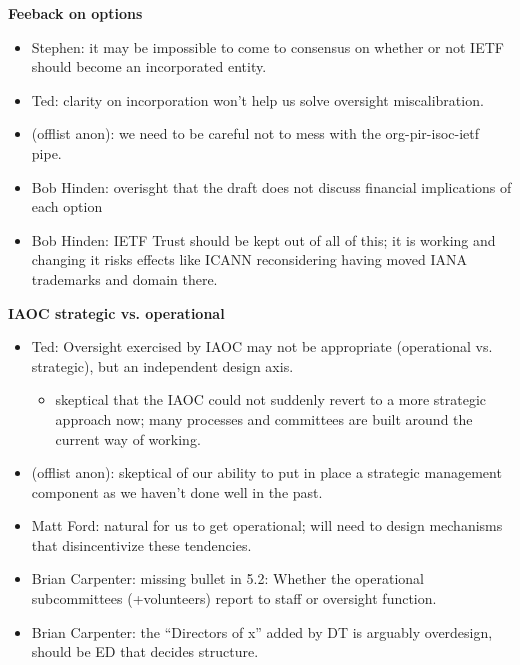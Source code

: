 \documentclass[helvetica]{seminar}
\newcommand{\heading}[1]{%
  \begin{center} 
    \large\bf 
    #1 
  \end{center} 
  \vspace{.4 in}}
\begin{document}
\begin{slide}

\heading{Feeback on options}

\begin{itemize}
\item Stephen: it may be impossible to come to consensus on whether or
  not IETF should become an incorporated entity.
\item Ted: clarity on incorporation won't help us solve oversight
  miscalibration.
\item (offlist anon): we need to be careful not to mess with the
  org-pir-isoc-ietf pipe.
\item Bob Hinden: overisght that the draft does not discuss financial
  implications of each option
\item Bob Hinden: IETF Trust should be kept out of all of this; it is
  working and changing it risks effects like ICANN reconsidering
  having moved IANA trademarks and domain there.
\end{itemize}

\end{slide}


\begin{slide}

\heading{IAOC strategic vs. operational}

\vspace{-8ex}         %
\begin{itemize}
\item Ted: Oversight exercised by IAOC may not be appropriate
  (operational vs. strategic), but an independent design axis.
  \begin{itemize}
  \item skeptical that the IAOC could not suddenly revert to a more
    strategic approach now; many processes and committees are built
    around the current way of working.
  \end{itemize}
\item (offlist anon): skeptical of our ability to put in place a
  strategic management component as we haven’t done well in the past.
\item Matt Ford: natural for us to get operational; will need to
  design mechanisms that disincentivize these tendencies.
\item Brian Carpenter: missing bullet in 5.2: Whether the operational
  subcommittees (+volunteers) report to staff or oversight function.
\item Brian Carpenter: the ``Directors of x'' added by DT is arguably
  overdesign, should be ED that decides structure.
\end{itemize}

\end{slide}
\end{document}
